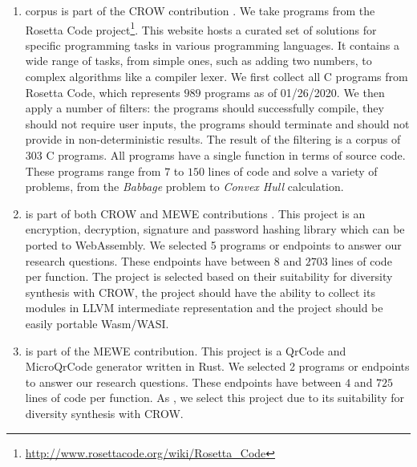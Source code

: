 \begin{enumerate}
    \item \textbf{\corpusrosetta} corpus is part of the CROW contribution \cite{}. We take programs from the  Rosetta Code project\footnote{\url{http://www.rosettacode.org/wiki/Rosetta_Code}}. This website hosts a curated set of solutions for specific programming tasks in various  programming languages. It contains a wide range of tasks, from simple ones, such as adding two numbers, to complex algorithms like a compiler lexer.  We first collect all C programs from Rosetta Code, which represents $989$ programs as of 01/26/2020.  We then apply a number of filters: the programs should successfully compile, they should not require user inputs, the programs should terminate and should not provide in non-deterministic results. The result of the filtering is a corpus of 303 C programs. All programs have a single function in terms of source code. These programs range from $7$ to $150$ lines of code and solve a variety of problems, from the \textit{Babbage} problem to  \textit{Convex Hull} calculation.
    \item \textbf{\corpussodium} is part of both CROW and MEWE contributions \cite{} \cite{}. This project is an encryption, decryption, signature and password hashing library which can be ported to WebAssembly.
    We selected 5 programs or endpoints to answer our research questions. These endpoints have between $8$ and $2703$ lines of code per function.  The project is selected based on their suitability for  diversity synthesis with CROW, \ie the project should have the ability to collect its modules in LLVM intermediate representation and the project should be easily portable Wasm/WASI.

    \item \textbf{\corpusqrcode} is part of the MEWE contribution. This project is a QrCode and MicroQrCode generator written in Rust. We selected 2 programs or endpoints to answer our research questions. These endpoints have between $4$ and $725$ lines of code per function. As \corpussodium, we select this project due to its suitability for diversity synthesis with CROW.
\end{enumerate}



